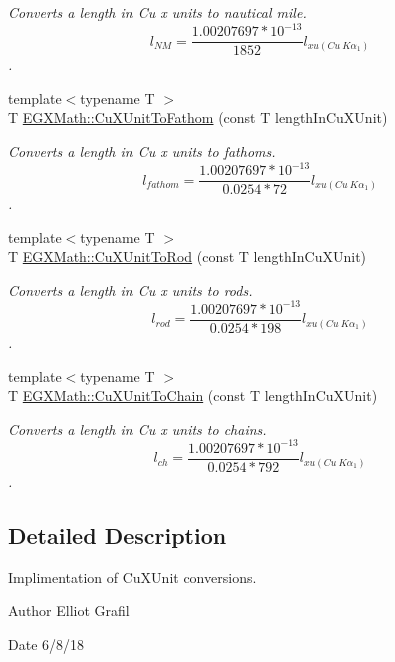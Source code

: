 \begin{DoxyCompactItemize}
\begin{DoxyCompactList}\small\item\em Converts a length in Cu x units to nautical mile. \[ l_{NM}= \frac{1.00207697*10^{-13}}{1852} l_{xu(Cu\ K\alpha_1)} \]. \end{DoxyCompactList}\item 
{\footnotesize template$<$typename T $>$ }\\T \mbox{\hyperlink{group___e_g_x_math-_conversions-_length_conversions-_non-_s_i-_cu_x_unit-_nautical_ga7a3671693beab30a832008ca1294732f}{E\+G\+X\+Math\+::\+Cu\+X\+Unit\+To\+Fathom}} (const T length\+In\+Cu\+X\+Unit)
\begin{DoxyCompactList}\small\item\em Converts a length in Cu x units to fathoms. \[ l_{fathom}= \frac{1.00207697*10^{-13}}{0.0254 * 72} l_{xu(Cu\ K\alpha_1)} \]. \end{DoxyCompactList}\item 
{\footnotesize template$<$typename T $>$ }\\T \mbox{\hyperlink{group___e_g_x_math-_conversions-_length_conversions-_non-_s_i-_cu_x_unit-_surveyors_ga3506ca573e8ba770792a7cf123bceb79}{E\+G\+X\+Math\+::\+Cu\+X\+Unit\+To\+Rod}} (const T length\+In\+Cu\+X\+Unit)
\begin{DoxyCompactList}\small\item\em Converts a length in Cu x units to rods. \[ l_{rod}= \frac{1.00207697*10^{-13}}{0.0254 * 198} l_{xu(Cu\ K\alpha_1)} \]. \end{DoxyCompactList}\item 
{\footnotesize template$<$typename T $>$ }\\T \mbox{\hyperlink{group___e_g_x_math-_conversions-_length_conversions-_non-_s_i-_cu_x_unit-_surveyors_ga504934f43d4950cb582134d718952f3b}{E\+G\+X\+Math\+::\+Cu\+X\+Unit\+To\+Chain}} (const T length\+In\+Cu\+X\+Unit)
\begin{DoxyCompactList}\small\item\em Converts a length in Cu x units to chains. \[ l_{ch}= \frac{1.00207697*10^{-13}}{0.0254 * 792} l_{xu(Cu\ K\alpha_1)} \]. \end{DoxyCompactList}\end{DoxyCompactItemize}


\subsection{Detailed Description}
Implimentation of Cu\+X\+Unit conversions. 

\begin{DoxyAuthor}{Author}
Elliot Grafil 
\end{DoxyAuthor}
\begin{DoxyDate}{Date}
6/8/18 
\end{DoxyDate}
